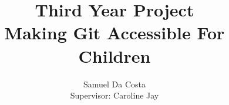 \documentclass[a4paper]{report}
\begin{document}
\title{Third Year Project \\
\large Making Git Accessible For Children \\
}
\author{Samuel Da Costa\\
Supervisor: Caroline Jay}
\maketitle






\end{document}
